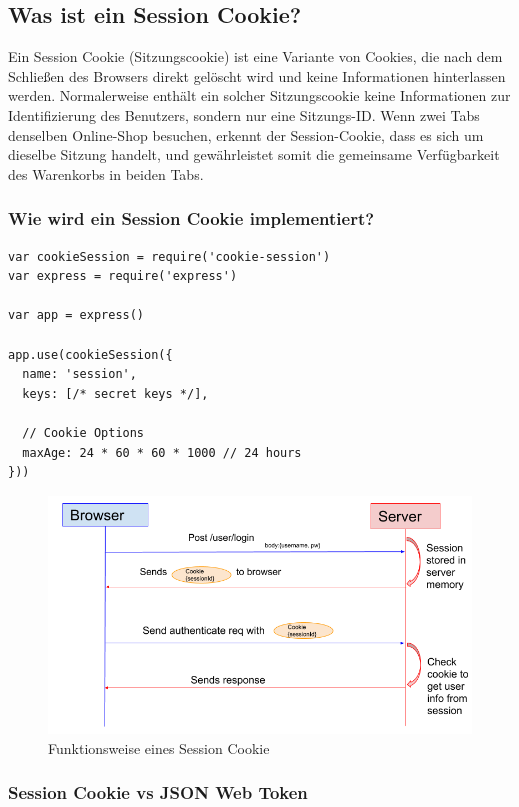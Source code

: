 \subsection{Was ist ein Session Cookie?}


Ein Session Cookie (Sitzungscookie) ist eine Variante von Cookies, die nach dem Schließen des Browsers direkt gelöscht wird und keine Informationen hinterlassen werden. Normalerweise enthält ein solcher Sitzungscookie keine Informationen zur Identifizierung des Benutzers, sondern nur eine Sitzungs-ID.
Wenn zwei Tabs denselben Online-Shop besuchen, erkennt der Session-Cookie, dass es sich um dieselbe Sitzung handelt, und gewährleistet somit die gemeinsame Verfügbarkeit des Warenkorbs in beiden Tabs.

\subsubsection{Wie wird ein Session Cookie implementiert?}

\begin{lstlisting}[caption=Implementierung Session Cookie]
var cookieSession = require('cookie-session')
var express = require('express')

var app = express()

app.use(cookieSession({
  name: 'session',
  keys: [/* secret keys */],

  // Cookie Options
  maxAge: 24 * 60 * 60 * 1000 // 24 hours
}))
\end{lstlisting}


\begin{figure}[h!]
    \centering
    \includegraphics[width=0.7\linewidth]{pics/session-cookie-funktion.png}
    \caption{Funktionsweise eines Session Cookie}
    \label{fig:enter-label}
\end{figure}

\subsubsection{Session Cookie vs JSON Web Token}

